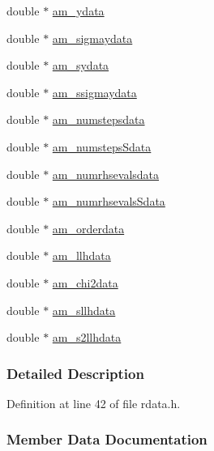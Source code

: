 \begin{DoxyCompactItemize}
double $\ast$ \hyperlink{struct_return_data_a24568582aa8de699ea1ce53323ff26ca}{am\+\_\+ydata}
\item 
double $\ast$ \hyperlink{struct_return_data_a36512c21e11b127a3d0326ff82ed6373}{am\+\_\+sigmaydata}
\item 
double $\ast$ \hyperlink{struct_return_data_ad929fcdabf8be8e21427cba880bc7ebb}{am\+\_\+sydata}
\item 
double $\ast$ \hyperlink{struct_return_data_a37d8072bd513f93263203bfad00705ff}{am\+\_\+ssigmaydata}
\item 
double $\ast$ \hyperlink{struct_return_data_a2ebada170b4bc6a2337794e4ec08d77c}{am\+\_\+numstepsdata}
\item 
double $\ast$ \hyperlink{struct_return_data_a6852d3762d59842903ef737ed511dc43}{am\+\_\+numsteps\+Sdata}
\item 
double $\ast$ \hyperlink{struct_return_data_a480d4eb0a1a568f64b8e939105a0b627}{am\+\_\+numrhsevalsdata}
\item 
double $\ast$ \hyperlink{struct_return_data_a77e958126968de6f5ee3bd1d22129641}{am\+\_\+numrhsevals\+Sdata}
\item 
double $\ast$ \hyperlink{struct_return_data_af792e4a1c5c23c5232ef9398e25de1a7}{am\+\_\+orderdata}
\item 
double $\ast$ \hyperlink{struct_return_data_af95fa143e0e524652f9a818f6288b544}{am\+\_\+llhdata}
\item 
double $\ast$ \hyperlink{struct_return_data_ae0fc05ce8c52bdda5c7bff541c79945d}{am\+\_\+chi2data}
\item 
double $\ast$ \hyperlink{struct_return_data_a45bc00583c09b05b35fa1a1874225aff}{am\+\_\+sllhdata}
\item 
double $\ast$ \hyperlink{struct_return_data_ae3b580f13058daf716d947dd7a0e9cd8}{am\+\_\+s2llhdata}
\end{DoxyCompactItemize}


\subsubsection{Detailed Description}


Definition at line 42 of file rdata.\+h.



\subsubsection{Member Data Documentation}
\hypertarget{struct_return_data_a577298549da7c9dbe3d93fbf3bc17866}{}

